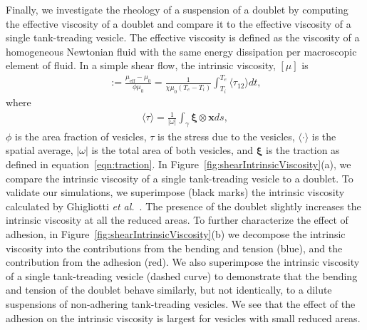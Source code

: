 \documentclass[prf,superscriptaddress,showkeys]{revtex4-1}
\newcommand{\xx}{\mathbf{x}}
\newcommand{\xxi}{\boldsymbol{\xi}}
\begin{document}
Finally, we investigate the rheology of a suspension of a doublet by
computing the effective viscosity of a doublet and compare it to the
effective viscosity of a single tank-treading vesicle. The effective
viscosity is defined as the viscosity of a homogeneous Newtonian fluid
with the same energy dissipation per macroscopic element of fluid.  In a
simple shear flow, the intrinsic viscosity, $[\mu]$ is
\begin{align*}
  [\mu]:= \frac{\mu_{\mathrm{eff}} - \mu_0}{\phi \mu_0} = 
  \frac{1}{\chi \mu_0 (T_e - T_i)} \int_{T_i}^{T_e} 
  \langle \tau_{12} \rangle dt,
\end{align*}
where
\begin{align*}
  \langle \tau \rangle = \frac{1}{|\omega|} \int_{\gamma}
    \xxi \otimes \xx ds,
\end{align*}
$\phi$ is the area fraction of vesicles, $\tau$ is the stress due to the
vesicles, $\langle \cdot \rangle$ is the spatial average, $|\omega|$ is
the total area of both vesicles, and $\xxi$ is the traction as defined
in equation~\eqref{eqn:traction}.  In
Figure~\ref{fig:shearIntrinsicViscosity}(a), we compare the intrinsic
viscosity of a single tank-treading vesicle to a doublet.  To validate
our simulations, we superimpose (black marks) the intrinsic viscosity
calculated by Ghigliotti {\em et
al.}~\cite{GhigliottiBibenMisbah2010_JFM}.  The presence of the doublet
slightly increases the intrinsic viscosity at all the reduced areas.  To
further characterize the effect of adhesion, in
Figure~\ref{fig:shearIntrinsicViscosity}(b) we decompose the intrinsic
viscosity into the contributions from the bending and tension (blue),
and the contribution from the adhesion (red).  We also superimpose the
intrinsic viscosity of a single tank-treading vesicle (dashed curve) to
demonstrate that the bending and tension of the doublet behave
similarly, but not identically, to a dilute suspensions of non-adhering
tank-treading vesicles.  We see that the effect of the adhesion on the
intrinsic viscosity is largest for vesicles with small reduced areas.
\end{document}
